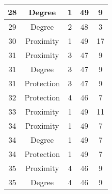 \documentclass[results.tex]{subfiles}
\begin{document}
\begin{center}
\begin{tabular}{| c || c | c | c | c |}
            \hline
            28                      & Degree                       & 1                      & 49                      & 9                    \\
            \hline
            29                      & Degree                       & 2                      & 48                      & 3                    \\
            \hline
            30                      & Proximity                    & 1                      & 49                      & 17                   \\
            \hline
            31                      & Proximity                    & 3                      & 47                      & 9                    \\
            \hline
            31                      & Degree                       & 3                      & 47                      & 9                    \\
            \hline
            31                      & Protection                   & 3                      & 47                      & 9                    \\
            \hline
            32                      & Protection                   & 4                      & 46                      & 7                    \\
            \hline
            33                      & Proximity                    & 1                      & 49                      & 11                   \\
            \hline
            34                      & Proximity                    & 1                      & 49                      & 7                    \\
            \hline
            34                      & Degree                       & 1                      & 49                      & 7                    \\
            \hline
            34                      & Protection                   & 1                      & 49                      & 7                    \\
            \hline
            35                      & Proximity                    & 4                      & 46                      & 9                    \\
            \hline
            35                      & Degree                       & 4                      & 46                      & 9                    \\

\end{tabular}
\end{center}
\end{document}
